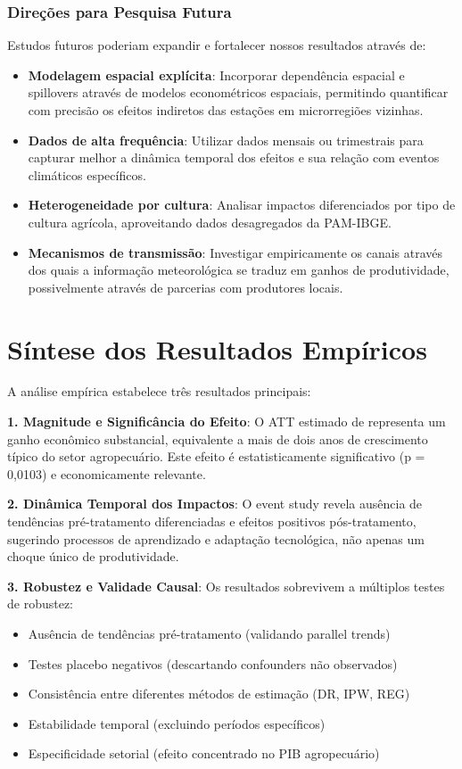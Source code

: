 \documentclass[
	12pt,				%
	oneside,			%
	a4paper,			%
	english,			%
	french,				%
	spanish,			%
	brazil				%
	]{abntex2}
\begin{document}
\subsubsection{Direções para Pesquisa Futura}

Estudos futuros poderiam expandir e fortalecer nossos resultados através de:

\begin{itemize}
\item \textbf{Modelagem espacial explícita}: Incorporar dependência espacial e spillovers através de modelos econométricos espaciais, permitindo quantificar com precisão os efeitos indiretos das estações em microrregiões vizinhas.

\item \textbf{Dados de alta frequência}: Utilizar dados mensais ou trimestrais para capturar melhor a dinâmica temporal dos efeitos e sua relação com eventos climáticos específicos.

\item \textbf{Heterogeneidade por cultura}: Analisar impactos diferenciados por tipo de cultura agrícola, aproveitando dados desagregados da PAM-IBGE.

\item \textbf{Mecanismos de transmissão}: Investigar empiricamente os canais através dos quais a informação meteorológica se traduz em ganhos de produtividade, possivelmente através de parcerias com produtores locais.
\end{itemize}

\section{Síntese dos Resultados Empíricos}

A análise empírica estabelece três resultados principais:

\textbf{1. Magnitude e Significância do Efeito}: O ATT estimado de \mainattpct{} representa um ganho econômico substancial, equivalente a mais de dois anos de crescimento típico do setor agropecuário. Este efeito é estatisticamente significativo (p = 0,0103) e economicamente relevante.

\textbf{2. Dinâmica Temporal dos Impactos}: O event study revela ausência de tendências pré-tratamento diferenciadas e efeitos positivos pós-tratamento, sugerindo processos de aprendizado e adaptação tecnológica, não apenas um choque único de produtividade.

\textbf{3. Robustez e Validade Causal}: Os resultados sobrevivem a múltiplos testes de robustez:
\begin{itemize}
\item Ausência de tendências pré-tratamento (validando parallel trends)
\item Testes placebo negativos (descartando confounders não observados)
\item Consistência entre diferentes métodos de estimação (DR, IPW, REG)
\item Estabilidade temporal (excluindo períodos específicos)
\item Especificidade setorial (efeito concentrado no PIB agropecuário)
\end{itemize}
\end{document}
